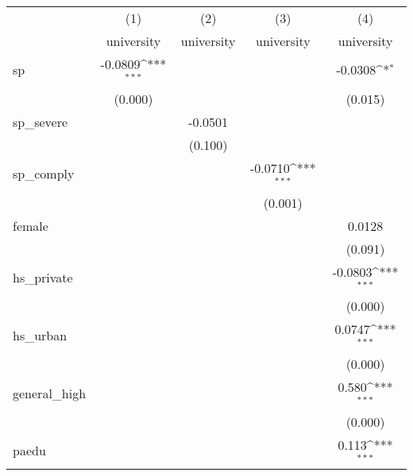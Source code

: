 {
\def\sym#1{\ifmmode^{#1}\else\(^{#1}\)\fi}
\begin{tabular}{l*{4}{c}}
\hline\hline
            &\multicolumn{1}{c}{(1)}&\multicolumn{1}{c}{(2)}&\multicolumn{1}{c}{(3)}&\multicolumn{1}{c}{(4)}\\
            &\multicolumn{1}{c}{university}&\multicolumn{1}{c}{university}&\multicolumn{1}{c}{university}&\multicolumn{1}{c}{university}\\
\hline
sp          &     -0.0809\sym{***}&                     &                     &     -0.0308\sym{*}  \\
            &     (0.000)         &                     &                     &     (0.015)         \\
[1em]
sp\_severe   &                     &     -0.0501         &                     &                     \\
            &                     &     (0.100)         &                     &                     \\
[1em]
sp\_comply   &                     &                     &     -0.0710\sym{***}&                     \\
            &                     &                     &     (0.001)         &                     \\
[1em]
female      &                     &                     &                     &      0.0128         \\
            &                     &                     &                     &     (0.091)         \\
[1em]
hs\_private  &                     &                     &                     &     -0.0803\sym{***}\\
            &                     &                     &                     &     (0.000)         \\
[1em]
hs\_urban    &                     &                     &                     &      0.0747\sym{***}\\
            &                     &                     &                     &     (0.000)         \\
[1em]
general\_high&                     &                     &                     &       0.580\sym{***}\\
            &                     &                     &                     &     (0.000)         \\
[1em]
paedu       &                     &                     &                     &       0.113\sym{***}\\

\end{tabular}}
